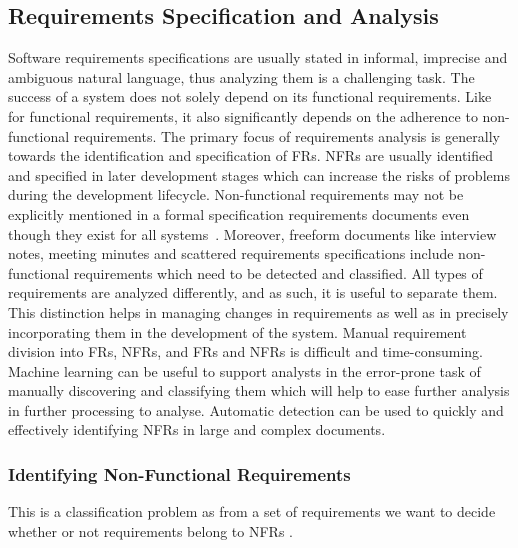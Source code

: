 \subsection{Requirements Specification and Analysis}

Software requirements specifications are usually stated in informal, imprecise and ambiguous natural language, thus analyzing them is a challenging task. 
The success of a system does not solely depend on its functional requirements.
Like for functional requirements, it also significantly depends on the adherence
to non-functional requirements. The primary focus of requirements analysis is
generally towards the identification and specification of FRs. NFRs are usually
identified and specified in later development stages which can increase the
risks of problems during the development lifecycle. Non-functional requirements may not be explicitly mentioned in a formal
specification requirements documents even though they exist for all
systems~\cite{Slankas:2013}. Moreover, freeform documents like interview notes,
meeting minutes and scattered requirements specifications include non-functional
requirements which need to be detected and classified.
All types of requirements are analyzed differently, and as such, it is
useful to separate them. This distinction helps in managing changes in
requirements as well as in precisely incorporating them in the development of
the system. Manual requirement division into FRs, NFRs, and  FRs and NFRs is difficult and
time-consuming. 
Machine learning can be
useful to support analysts in the error-prone task of manually discovering and
classifying them which will help to ease further analysis in further processing to analyse. Automatic detection can be used to quickly and effectively
identifying NFRs in large and complex documents.

\subsubsection{Identifying Non-Functional Requirements}

This
is a classification problem as from a set of requirements we want to decide
whether or not requirements belong to NFRs . \\

